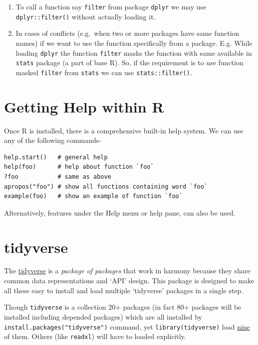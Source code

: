 \documentclass[
]{book}
\providecommand{\tightlist}{%
  \setlength{\itemsep}{0pt}\setlength{\parskip}{0pt}}
\begin{document}
\begin{enumerate}
\def\labelenumi{\arabic{enumi}.}
\tightlist
\item
  To call a function say \texttt{filter} from package \texttt{dplyr} we may use \texttt{dplyr::filter()} without actually loading it.\\
\item
  In cases of conflicts (e.g.~when two or more packages have same function names) if we want to use the function specifically from a package. E.g. While loading \texttt{dplyr} the function \texttt{filter} masks the function with same available in \texttt{stats} package (a part of base R). So, if the requirement is to use function masked \texttt{filter} from \texttt{stats} we can use \texttt{stats::filter()}.
\end{enumerate}

\hypertarget{help}{%
\section{Getting Help within R}\label{help}}

Once R is installed, there is a comprehensive built-in help system. We can use any of the following commands-

\begin{verbatim}
help.start()   # general help
help(foo)      # help about function `foo`
?foo           # same as above
apropos("foo") # show all functions containing word `foo`
example(foo)   # show an example of function `foo`
\end{verbatim}

Alternatively, features under the Help menu or help pane, can also be used.

\hypertarget{tidyverse}{%
\section{tidyverse}\label{tidyverse}}

The \href{https://www.tidyverse.org/}{tidyverse} is a \emph{package of packages} that work in harmony because they share common data representations and `API' design. This package is designed to make all these easy to install and load multiple `tidyverse' packages in a single step.

Though \texttt{tidyverse} is a collection 20+ packages (in fact 80+ packages will be installed including depended packages) which are all installed by \texttt{install.packages("tidyverse")} command, yet \texttt{library(tidyverse)} load \href{https://www.tidyverse.org/packages/}{nine} of them. Others (like \texttt{readxl}) will have to loaded explicitly.
\end{document}
